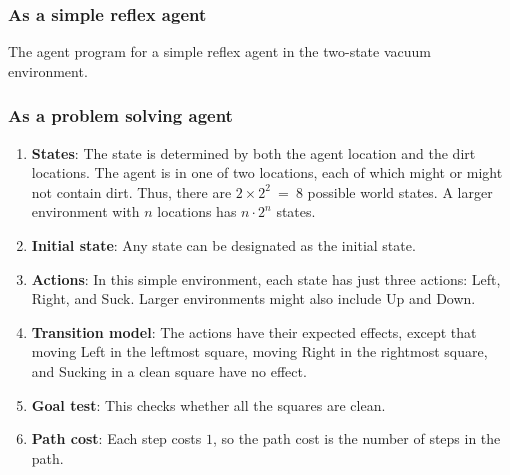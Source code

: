 \subsubsection{As a simple reflex agent}

\begin{algorithm}[H]
    \caption{The agent program for a simple reflex agent in the two-state vacuum environment.  \cite{ai/book/Artificial-Intelligence-A-Modern-Approach/Russell-Norvig}}

\end{algorithm}







\subsubsection{As a problem solving agent}

\begin{enumerate}[itemsep=0.2cm]
    \item \textbf{States}: The state is determined by both the agent location and the dirt locations. The agent is in one of two locations, each of which might or might not contain dirt. Thus, there are $2 \times 2^2\ =\ 8$ possible world states. A larger environment with $n$ locations has $n \cdot 2^n$ states.

    \item \textbf{Initial state}: Any state can be designated as the initial state.

    \item \textbf{Actions}: In this simple environment, each state has just three actions: Left, Right, and Suck. Larger environments might also include Up and Down.

    \item \textbf{Transition model}: The actions have their expected effects, except that moving Left in the leftmost square, moving Right in the rightmost square, and Sucking in a clean square have no effect.

    \item \textbf{Goal test}: This checks whether all the squares are clean.

    \item \textbf{Path cost}: Each step costs $1$, so the path cost is the number of steps in the path.
\end{enumerate}











